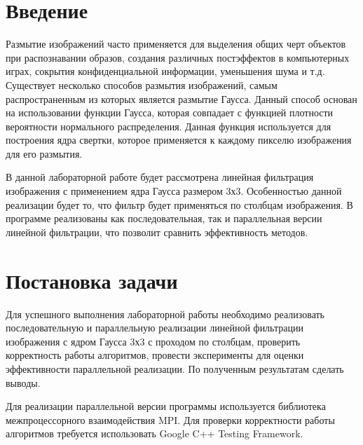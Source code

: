 \documentclass{report}
\begin{document}
\setcounter{page}{2}

\tableofcontents
\newpage

\section*{Введение}
Размытие изображений часто применяется для выделения общих черт объектов при распознавании образов, создания различных постэффектов в компьютерных играх, сокрытия конфиденциальной информации, уменьшения шума и т.д. Существует несколько способов размытия изображений, самым распространенным из которых является размытие Гаусса. Данный способ основан на использовании функции Гаусса, которая совпадает с функцией плотности вероятности нормального распределения. Данная функция используется для построения ядра свертки, которое применяется к каждому пикселю изображения для его размытия. \par
В данной лабораторной работе будет рассмотрена линейная фильтрация изображения с применением ядра Гаусса размером 3х3. Особенностью данной реализации будет то, что фильтр будет применяться по столбцам изображения. В программе реализованы как последовательная, так и параллельная версии линейной фильтрации, что позволит сравнить эффективность методов.
\newpage

\section*{Постановка задачи}
Для успешного выполнения лабораторной работы необходимо реализовать последовательную и параллельную реализации линейной фильтрации изображения с ядром Гаусса 3х3 с проходом по столбцам, проверить корректность работы алгоритмов, провести эксперименты для оценки эффективности параллельной реализации. По полученным результатам сделать выводы. \par 
Для реализации параллельной версии программы используется библиотека межпроцессорного взаимодействия MPI. Для проверки корректности работы алгоритмов требуется использовать Google C++ Testing Framework.
\newpage

\end{document}
